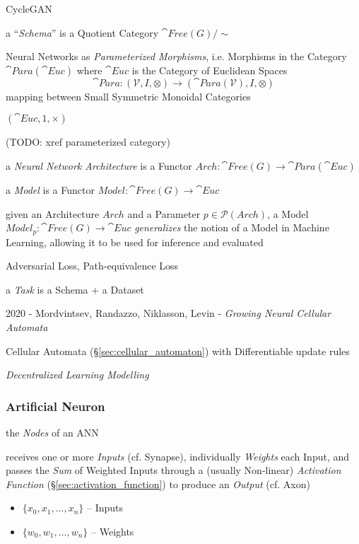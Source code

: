 CycleGAN

a ``\emph{Schema}'' is a Quotient Category $\cat{Free}(G)/\sim$

Neural Networks as \emph{Parameterized Morphisms}, i.e. Morphisms in the
Category $\cat{Para}(\cat{Euc})$ where $\cat{Euc}$ is the Category of Euclidean
Spaces
\[
  \cat{Para} : (\mathcal{V}, I, \otimes)
    \rightarrow (\cat{Para}(\mathcal{V}), I, \otimes)
\]
mapping between Small Symmetric Monoidal Categories

$(\cat{Euc}, 1, \times)$

(TODO: xref parameterized category)

a \emph{Neural Network Architecture} is a Functor
$Arch : \cat{Free}(G) \rightarrow \cat{Para}(\cat{Euc})$

a \emph{Model} is a Functor $Model : \cat{Free}(G) \rightarrow \cat{Euc}$

given an Architecture $Arch$ and a Parameter $p \in \mathcal{P}(Arch)$, a Model
$Model_p : \cat{Free}(G) \rightarrow \cat{Euc}$ \emph{generalizes} the notion of
a Model in Machine Learning, allowing it to be used for inference and evaluated

Adversarial Loss, Path-equivalence Loss

a \emph{Task} is a Schema + a Dataset

\asterism

2020 - Mordvintsev, Randazzo, Niklasson, Levin - \emph{Growing Neural Cellular
  Automata}

Cellular Automata (\S\ref{sec:cellular_automaton}) with Differentiable update
rules

\emph{Decentralized Learning Modelling}



\subsubsection{Artificial Neuron}\label{sec:artificial_neuron}

the \emph{Nodes} of an ANN

receives one or more \emph{Inputs} (cf. Synapse), individually \emph{Weights}
each Input, and passes the \emph{Sum} of Weighted Inputs through a (usually
Non-linear) \emph{Activation Function} (\S\ref{sec:activation_function}) to
produce an \emph{Output} (cf. Axon)

\begin{itemize}
  \item $\{ x_0, x_1, \ldots, x_n \}$ -- Inputs
  \item $\{ w_0, w_1, \ldots, w_n \}$ -- Weights
\end{itemize}

